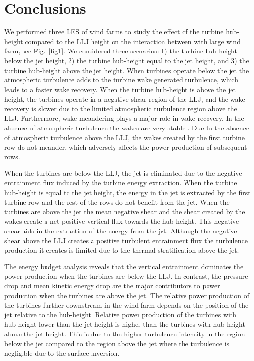 \documentclass[%
 aip,
 amsmath,amssymb,
preprint,%
author-numerical,%
]{revtex4-1}
\begin{document}
\section{Conclusions}\label{sec4} 
We performed three LES of wind farms to study the effect of the turbine hub-height compared to the LLJ height on the interaction between with large wind farm, see Fig.\ \ref{fig1}. We considered three scenarios: 1) the turbine hub-height below the jet height, 2) the turbine hub-height equal to the jet height, and 3) the turbine hub-height above the jet height. When turbines operate below the jet the atmospheric turbulence adds to the turbine wake generated turbulence, which leads to a faster wake recovery. When the turbine hub-height is above the jet height, the turbines operate in a negative shear region of the LLJ, and the wake recovery is slower due to the limited atmospheric turbulence region above the LLJ. Furthermore, wake meandering plays a major role in wake recovery. In the absence of atmospheric turbulence the wakes are very stable \cite{mao18, kec14}. Due to the absence of atmospheric turbulence above the LLJ, the wakes created by the first turbine row do not meander, which adversely affects the power production of subsequent rows.

When the turbines are below the LLJ, the jet is eliminated due to the negative entrainment flux induced by the turbine energy extraction. When the turbine hub-height is equal to the jet height, the energy in the jet is extracted by the first turbine row and the rest of the rows do not benefit from the jet. When the turbines are above the jet the mean negative shear and the shear created by the wakes create a net positive vertical flux towards the hub-height. This {\color{black} negative shear aids in the extraction} of the energy from the jet. Although the negative shear above the LLJ creates a positive turbulent entrainment flux the turbulence production it creates is limited due to the thermal stratification above the jet.

The energy budget analysis reveals that the vertical entrainment dominates the power production when the turbines are below the LLJ. In contrast, the pressure drop and mean kinetic energy drop are the major contributors to power production when the turbines are above the jet. The relative power production of the turbines further downstream in the wind farm depends on the position of the jet relative to the hub-height. {\color{black} Relative power production of the turbines with hub-height lower than the jet-height is higher than the turbines with hub-height above the jet-height. This is due to the higher turbulence intensity in the region below the jet compared to the region above the jet where the turbulence is negligible due to the surface inversion.}
\end{document}

